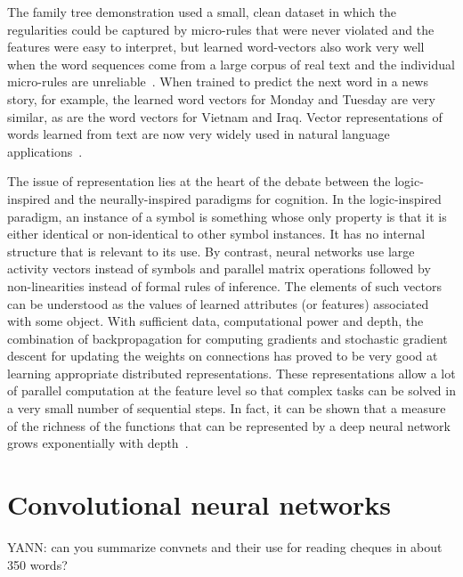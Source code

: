 \documentclass[]{article}
\begin{document}
The family tree demonstration used a small, clean dataset in which the
regularities could be captured by micro-rules that were never violated and
the features were easy to interpret, but learned word-vectors also work
very well when the word sequences come from a large corpus of real text and
the individual micro-rules are unreliable~\citep{BenDucVin01-short}. When trained to
predict the next word in a news story, for example, the learned word
vectors for Monday and Tuesday are very similar, as are the word vectors
for Vietnam and Iraq.  Vector representations of words learned from text
are now very widely used in natural language applications~\cite{Schwenk-2007,CollobertR2008-short,
Mikolov-Interspeech-2011-small,Socher-2011}.

The issue of representation lies at the heart of the debate between the
logic-inspired and the neurally-inspired paradigms for cognition. In the
logic-inspired paradigm, an instance of a symbol is something whose only
property is that it is either identical or non-identical to other symbol
instances. It has no internal structure that is relevant to its use. By
contrast, neural networks use large activity vectors instead of symbols and
parallel matrix operations followed by non-linearities instead of formal
rules of inference. The elements of such vectors can be understood as
the values of learned attributes (or features) associated with some object. 
With sufficient data, computational power and depth,
the combination of backpropagation for computing gradients and stochastic
gradient descent for updating the weights on connections has proved to be
very good at learning appropriate distributed representations. These
representations allow a lot of parallel computation at the feature level so
that complex tasks can be solved in a very small number of sequential
steps. In fact, it can be shown that a measure of the richness of the functions
that can be represented by a deep neural network grows exponentially
with depth~\citep{Montufar-et-al-NIPS2014}.

\section{Convolutional neural networks}


YANN: can you summarize convnets and their use for reading cheques in about
350 words?

\citep{LeCun89-small}

\end{document}
